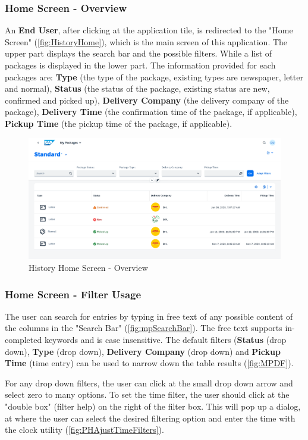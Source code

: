 \subsubsection{Home Screen - Overview}
An \textbf{End User}, after clicking at the application tile, is redirected to the "Home Screen" (\autoref{fig:HistoryHome}), which is the main screen of this application. The upper part displays the search bar and the possible filters. While a list of packages is displayed in the lower part. The information provided for each packages are: \textbf{Type} (the type of the package, existing types are newspaper, letter and normal), \textbf{Status} (the status of the package, existing status are new, confirmed and picked up), \textbf{Delivery Company} (the delivery company of the package), \textbf{Delivery Time} (the confirmation time of the package, if applicable), \textbf{Pickup Time} (the pickup time of the package, if applicable).

\begin{figure}[H]
	\centering
	\includegraphics[width=1\linewidth]{images/user_doc/myPack/overview.png}
	\caption{History Home Screen - Overview}
	\label{fig:HistoryHome}
\end{figure}

\subsubsection{Home Screen - Filter Usage}
The user can search for entries by typing in free text of any possible content of the columns in the "Search Bar" (\autoref{fig:mpSearchBar}). The free text supports in-completed keywords and is case insensitive. 
The default filters (\textbf{Status} (drop down), \textbf{Type} (drop down), \textbf{Delivery Company} (drop down) and \textbf{Pickup Time} (time entry) can be used to narrow down the table results (\autoref{fig:MPDF}). 

For any drop down filters, the user can click at the small drop down arrow and select zero to many options. To set the time filter, the user should click at the "double box" (filter help) on the right of the filter box. This will pop up a dialog, at where the user can select the desired filtering option and enter the time with the clock utility (\autoref{fig:PHAjustTimeFilters}). 

